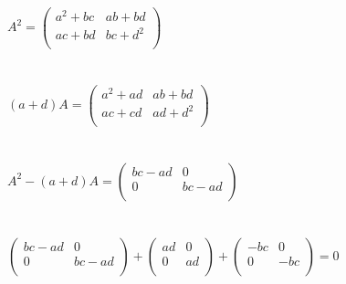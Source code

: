 \documentclass[12pt, a4paper]{article}
\begin{document}
	   \\\\\\
	   \begin{math}
	   	A^2 = 
	   	\left(
	   	\begin{array}{rr}
	   		a^2 + bc  & ab + bd \\
	   		ac  + bd & bc + d ^ 2 \\
	   	\end{array}
	   	\right )
	   \end{math}
	   \\\\\\
	   \begin{math}
	    (a + d)A = 
	   	\left(
	   	\begin{array}{rr}
	   		a ^ 2  + ad & ab + bd \\
	   		ac + cd & ad + d ^ 2 \\
	   	\end{array}
	   	\right )
	   \end{math}
	   \\\\\\
	   \begin{math}
	   	A ^ 2 - (a + d)A = 
	   	\left(
	   	\begin{array}{rr}
	   		bc -  ad & 0 \\
	   		0 & bc - ad \\
	   	\end{array}
	   	\right )
	   \end{math}
	   \\\\\\
	   \begin{math}
	   	\left(
	   	\begin{array}{rr}
	   		bc -  ad & 0 \\
	   		0 & bc - ad \\
	   	\end{array}
	   	\right )
	   	+
	   	\left(
	   	\begin{array}{rr}
	   	    ad & 0 \\
	   		0 & ad \\
	   	\end{array}
	   	\right )
	   	+
	   	\left(
	   	\begin{array}{rr}
	   		-bc & 0 \\
	   		0 & -bc \\
	   	\end{array}
	   	\right )
	   	= 0
	   \end{math}
\end{document}
